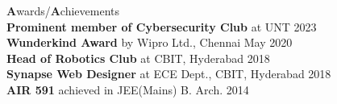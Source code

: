 \documentclass[a4paper]{article}
\begin{document}
{\textbf{A}wards/\textbf{A}chievements \hrulefill}\\
{\textbf{Prominent member of Cybersecurity Club} at UNT \hfill {\small 2023}}\\
{\textbf{Wunderkind Award} by Wipro Ltd., Chennai \hfill {\small May 2020}}\\
{\textbf{Head of Robotics Club} at CBIT, Hyderabad \hfill {\small 2018}}\\
{\textbf{Synapse Web Designer} at ECE Dept., CBIT, Hyderabad \hfill {\small 2018}}\\
{\textbf{AIR 591} achieved in JEE(Mains) B. Arch. \hfill {\small 2014}}\\

\end{document}
